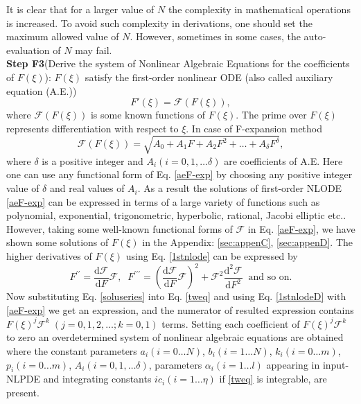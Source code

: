 \documentclass[prd,aps,floats,showkeys,nofootinbib,notitlepage]{revtex4}
\begin{document}
	It is clear that for a larger value of $N$ the complexity in mathematical operations is increased. To avoid such complexity in derivations, one should set the maximum allowed value of $N$. However, sometimes in some cases, the auto-evaluation of $N$ may fail. \\
	
	
	\textbf{Step F3}(Derive the system of Nonlinear Algebraic Equations for the coefficients of $F(\xi)$):
	$F(\xi)$ satisfy the first-order nonlinear ODE (also called auxiliary equation (A.E.))
	\begin{equation}\label{1stnlode}
		{F'\left( \xi  \right)} = \mathcal{F}(F(\xi)),
	\end{equation}
	where $\mathcal{F}(F(\xi))$ is some known functions of $F(\xi)$. The prime over $F(\xi)$ represents differentiation with respect to $\xi$. In case of F-expansion method
	\begin{equation} \label{aeF-exp}
		\mathcal{F}(F(\xi)) = \sqrt{{A_0} + {A_1}F + {A_2}{F^2} +  \ldots + {A_\delta }{F^\delta }},
	\end{equation}
	where $\delta$ is a positive integer and $A_i(i=0,1,\ldots \delta)$ are coefficients of A.E. Here one can use any functional form of Eq. \eqref{aeF-exp} by choosing any positive integer value of $\delta$ and real values of $A_i$. As a result the solutions of first-order NLODE \eqref{aeF-exp} can be expressed in terms of a large variety of functions such as polynomial, exponential, trigonometric, hyperbolic, rational, Jacobi elliptic etc.. 
	However, taking some well-known functional forms of $\mathcal{F}$ in Eq. \eqref{aeF-exp}, we have shown some solutions of $F(\xi)$ in the Appendix: \ref{sec:appenC}, \ref{sec:appenD}. The higher derivatives of $F(\xi)$ using Eq. \eqref{1stnlode} can be expressed by
	\begin{equation}\label{1stnlodeD}
		F^{\prime\prime}= \frac{\mathrm{d} \mathcal{F} }{\mathrm{d}F}\mathcal{F},\;\;F^{\prime\prime\prime}=\left(\frac{\mathrm{d} \mathcal{F} }{\mathrm{d}F}\mathcal{F}\right)^2+\mathcal{F}^2\frac{\mathrm{d^2} \mathcal{F} }{\mathrm{d}F^2}\;\; \text{and so on.}
	\end{equation}
	Now substituting Eq. \eqref{soluseries} into Eq. \eqref{tweq} and using Eq. \eqref{1stnlodeD} with \eqref{aeF-exp} we get an expression, and the numerator of resulted expression contains $F(\xi)^j{\mathcal{F}}^k\;(j=0,1,2,\ldots;k=0,1)$ terms. Setting each coefficient of $F(\xi)^j{\mathcal{F}}^k$ to zero an overdetermined system of nonlinear algebraic equations are obtained where the constant parameters $a_i(i=0\ldots N)$, $b_i(i=1\ldots N)$, $k_i(i=0\ldots m)$, $p_i(i=0\ldots m)$, $A_i(i=0,1,\ldots \delta)$, parameters $\alpha_i(i=1\ldots l)$ appearing in input-NLPDE and integrating constants $ic_i(i=1\ldots \eta)$ if \eqref{tweq} is integrable, are present. 
	
\end{document}
